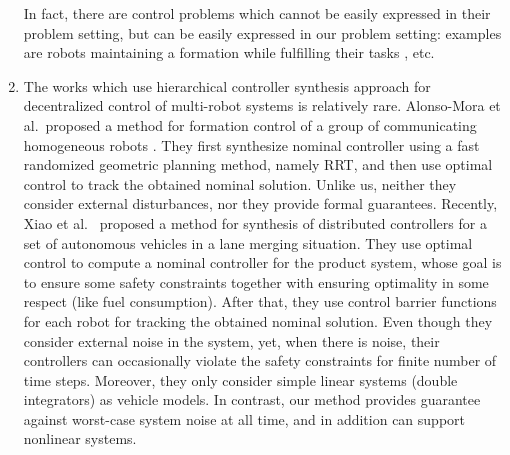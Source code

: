 \begin{enumerate}[(1)]
	In fact, there are control problems which cannot be easily expressed in their problem setting, but can be easily expressed in our problem setting: 
	examples are robots maintaining a formation while fulfilling their tasks \cite{alonso2019distributed}, etc.
	\item  The works which use hierarchical controller synthesis approach for decentralized control of multi-robot systems is relatively rare.
	Alonso-Mora et al.\ proposed a method for formation control of a group of communicating homogeneous robots \cite{alonso2019distributed}.
	They first synthesize nominal controller using a fast randomized geometric planning method, namely RRT, and then use optimal control to track the obtained nominal solution.
	Unlike us, neither they consider external disturbances, nor they provide formal guarantees.
	Recently, Xiao et al.\ \cite{xiao2019merging} proposed a method for synthesis of distributed controllers for a set of autonomous vehicles in a lane merging situation.
	They use optimal control to compute a nominal controller for the product system, whose goal is to ensure some safety constraints together with ensuring optimality in some respect (like fuel consumption).
	After that, they use control barrier functions for each robot for tracking the obtained nominal solution.
	Even though they consider external noise in the system, yet, when there is noise, their controllers can occasionally violate the safety constraints for finite number of time steps.
	Moreover, they only consider simple linear systems (double integrators) as vehicle models.
	In contrast, our method provides guarantee against worst-case system noise at all time, and in addition can support nonlinear systems. 
\end{enumerate}
 

